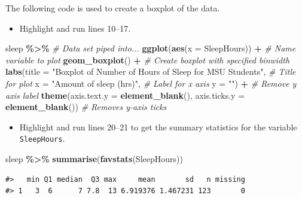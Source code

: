 \documentclass[
]{report}
\newenvironment{Shaded}{\begin{snugshade}}{\end{snugshade}}
\newcommand{\AttributeTok}[1]{\textcolor[rgb]{0.13,0.29,0.53}{#1}}
\newcommand{\CommentTok}[1]{\textcolor[rgb]{0.56,0.35,0.01}{\textit{#1}}}
\newcommand{\FunctionTok}[1]{\textcolor[rgb]{0.13,0.29,0.53}{\textbf{#1}}}
\newcommand{\NormalTok}[1]{#1}
\newcommand{\SpecialCharTok}[1]{\textcolor[rgb]{0.81,0.36,0.00}{\textbf{#1}}}
\newcommand{\StringTok}[1]{\textcolor[rgb]{0.31,0.60,0.02}{#1}}
\providecommand{\tightlist}{%
  \setlength{\itemsep}{0pt}\setlength{\parskip}{0pt}}
\begin{document}
The following code is used to create a boxplot of the data.

\begin{itemize}
\tightlist
\item
  Highlight and run lines 10--17.
\end{itemize}

\begin{Shaded}
\begin{Highlighting}[]
\NormalTok{sleep }\SpecialCharTok{\%\textgreater{}\%} \CommentTok{\# Data set piped into...}
    \FunctionTok{ggplot}\NormalTok{(}\FunctionTok{aes}\NormalTok{(}\AttributeTok{x =}\NormalTok{ SleepHours)) }\SpecialCharTok{+}   \CommentTok{\# Name variable to plot}
    \FunctionTok{geom\_boxplot}\NormalTok{() }\SpecialCharTok{+}  \CommentTok{\# Create boxplot with specified binwidth}
    \FunctionTok{labs}\NormalTok{(}\AttributeTok{title =} \StringTok{"Boxplot of Number of Hours of Sleep for MSU Students"}\NormalTok{, }\CommentTok{\# Title for plot}
       \AttributeTok{x =} \StringTok{"Amount of sleep (hrs)"}\NormalTok{, }\CommentTok{\# Label for x axis}
       \AttributeTok{y =} \StringTok{""}\NormalTok{) }\SpecialCharTok{+} \CommentTok{\# Remove y axis label}
    \FunctionTok{theme}\NormalTok{(}\AttributeTok{axis.text.y =} \FunctionTok{element\_blank}\NormalTok{(), }
          \AttributeTok{axis.ticks.y =} \FunctionTok{element\_blank}\NormalTok{()) }\CommentTok{\# Removes y{-}axis ticks}
\end{Highlighting}
\end{Shaded}

\begin{itemize}
\tightlist
\item
  Highlight and run lines 20--21 to get the summary statistics for the variable \texttt{SleepHours}.
\end{itemize}

\begin{Shaded}
\begin{Highlighting}[]
\NormalTok{sleep }\SpecialCharTok{\%\textgreater{}\%} 
  \FunctionTok{summarise}\NormalTok{(}\FunctionTok{favstats}\NormalTok{(SleepHours))}
\end{Highlighting}
\end{Shaded}

\begin{verbatim}
#>   min Q1 median  Q3 max     mean       sd   n missing
#> 1   3  6      7 7.8  13 6.919376 1.467231 123       0
\end{verbatim}
\end{document}
